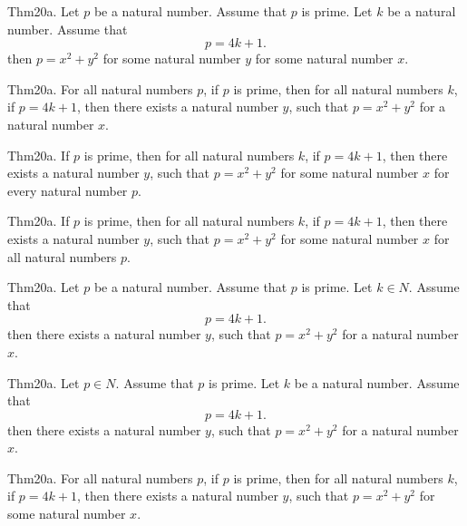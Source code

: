 \documentclass{article}
\begin{document}
Thm20a. Let $p$ be a natural number. Assume that $p$ is prime. Let $k$ be a natural number. Assume that $$p = 4 k + 1.$$ then $p = x ^{ 2}+ y ^{ 2}$ for some natural number $y$ for some natural number $x$.

Thm20a. For all natural numbers $p$, if $p$ is prime, then for all natural numbers $k$, if $p = 4 k + 1$, then there exists a natural number $y$, such that $p = x ^{ 2}+ y ^{ 2}$ for a natural number $x$.

Thm20a. If $p$ is prime, then for all natural numbers $k$, if $p = 4 k + 1$, then there exists a natural number $y$, such that $p = x ^{ 2}+ y ^{ 2}$ for some natural number $x$ for every natural number $p$.

Thm20a. If $p$ is prime, then for all natural numbers $k$, if $p = 4 k + 1$, then there exists a natural number $y$, such that $p = x ^{ 2}+ y ^{ 2}$ for some natural number $x$ for all natural numbers $p$.

Thm20a. Let $p$ be a natural number. Assume that $p$ is prime. Let $k \in N$. Assume that $$p = 4 k + 1.$$ then there exists a natural number $y$, such that $p = x ^{ 2}+ y ^{ 2}$ for a natural number $x$.

Thm20a. Let $p \in N$. Assume that $p$ is prime. Let $k$ be a natural number. Assume that $$p = 4 k + 1.$$ then there exists a natural number $y$, such that $p = x ^{ 2}+ y ^{ 2}$ for a natural number $x$.

Thm20a. For all natural numbers $p$, if $p$ is prime, then for all natural numbers $k$, if $p = 4 k + 1$, then there exists a natural number $y$, such that $p = x ^{ 2}+ y ^{ 2}$ for some natural number $x$.
\end{document}
